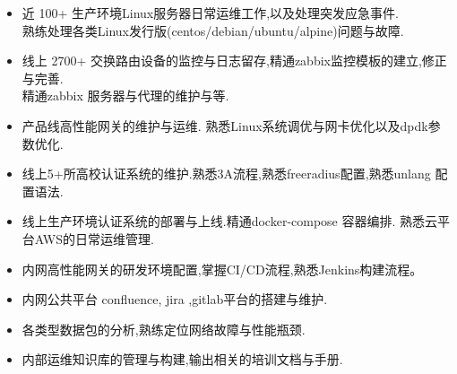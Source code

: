 \documentclass[zh]{resume}
\begin{document}
\begin{itemize}
  \item 近 100+ 生产环境Linux服务器日常运维工作,以及处理突发应急事件.\\ 熟练处理各类Linux发行版(centos/debian/ubuntu/alpine)问题与故障. 
  \item 线上 2700+ 交换路由设备的监控与日志留存,精通zabbix监控模板的建立,修正与完善.\\精通zabbix 服务器与代理的维护与等.
  \item 产品线高性能网关的维护与运维. 熟悉Linux系统调优与网卡优化以及dpdk参数优化.
  \item 线上5+所高校认证系统的维护.熟悉3A流程,熟悉freeradius配置,熟悉unlang 配置语法.
  \item 线上生产环境认证系统的部署与上线.精通docker-compose 容器编排. 熟悉云平台AWS的日常运维管理. 
  \item 内网高性能网关的研发环境配置,掌握CI/CD流程,熟悉Jenkins构建流程。
  \item 内网公共平台 confluence, jira ,gitlab平台的搭建与维护.
  \item 各类型数据包的分析,熟练定位网络故障与性能瓶颈.
  \item 内部运维知识库的管理与构建,输出相关的培训文档与手册.
\end{itemize}
\end{document}
